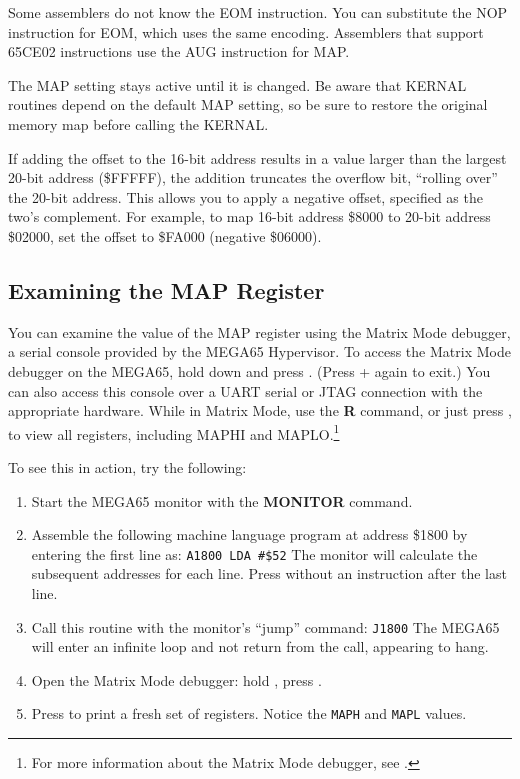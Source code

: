 Some assemblers do not know the EOM instruction. You can substitute the NOP instruction for EOM, which uses the same encoding. Assemblers that support 65CE02 instructions use the AUG instruction for MAP.

The MAP setting stays active until it is changed. Be aware that KERNAL routines depend on the default MAP setting, so be sure to restore the original memory map before calling the KERNAL.

If adding the offset to the 16-bit address results in a value larger than the largest 20-bit address (\$FFFFF), the addition truncates the overflow bit, ``rolling over'' the 20-bit address. This allows you to apply a negative offset, specified as the two's complement. For example, to map 16-bit address \$8000 to 20-bit address \$02000, set the offset to \$FA000 (negative \$06000).

\subsection{Examining the MAP Register}

You can examine the value of the MAP register using the Matrix Mode debugger, a serial console provided by the MEGA65 Hypervisor. To access the Matrix Mode debugger on the MEGA65, hold down \megasymbolkey and press . (Press \megasymbolkey +  again to exit.) You can also access this console over a UART serial or JTAG connection with the appropriate hardware. While in Matrix Mode, use the {\bf R} command, or just press , to view all registers, including MAPHI and MAPLO.\footnote{For more information about the Matrix Mode debugger, see .}

To see this in action, try the following:

\begin{enumerate}
\item Start the MEGA65 monitor with the {\bf MONITOR} command.
\item Assemble the following machine language program at address \$1800 by entering the first line as: \texttt{A1800 LDA \#\$52} The monitor will calculate the subsequent addresses for each line. Press  without an instruction after the last line.


\item Call this routine with the monitor's ``jump'' command: \texttt{J1800} The MEGA65 will enter an infinite loop and not return from the call, appearing to hang.
\item Open the Matrix Mode debugger: hold \megasymbolkey, press .
\item Press  to print a fresh set of registers. Notice the \texttt{MAPH} and \texttt{MAPL} values.
\end{enumerate}

